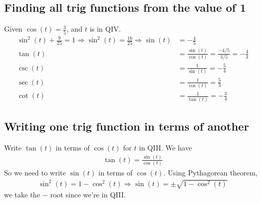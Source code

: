 \documentclass{tufte-handout}
\begin{document}
\subsection{Finding all trig functions from the value of 1}
Given $\cos(t) = \frac{3}{5}$, and $t$ is in QIV.
{\color{blue}
\begin{align*}
\sin^2(t) + \frac{9}{25} = 1 \Rightarrow \sin^2(t) = \frac{16}{25} \Rightarrow \sin(t) &= - \frac{4}{5} \\
\tan(t) &= \frac{\sin(t)}{\cos(t)} = \frac{-4/5}{3/5} = -\frac{4}{3} \\
\csc(t) &= \frac{1}{\sin(t)} = -\frac{5}{4} \\
\sec(t) &= \frac{1}{\cos(t)} = \frac{5}{3} \\
\cot(t) &= \frac{1}{\tan(t)} = -\frac{3}{4} 
\end{align*}
}

\subsection{Writing one trig function in terms of another}
Write $\tan(t)$ in terms of $\cos(t)$ for $t$ in QIII.
We have
\begin{align*}
\tan(t) = \frac{\sin(t)}{\cos(t)}
\end{align*}
So we need to write $\sin(t)$ in terms of $\cos(t)$.
Using Pythagorean theorem,
\begin{align*}
\sin^2(t) = 1 - \cos^2(t) \Rightarrow \sin(t) = \pm \sqrt{ 1 - \cos^2(t) }
\end{align*}
we take the $-$ root since we're in QIII.
\end{document}
